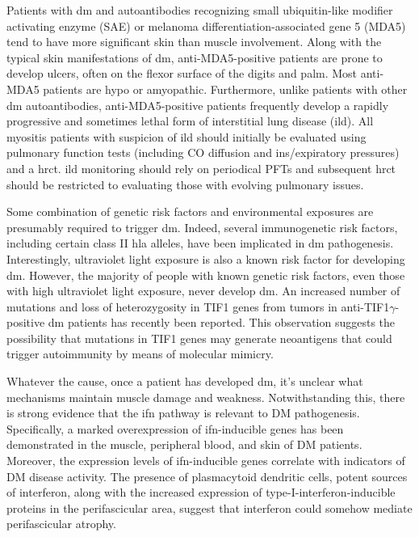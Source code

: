 Patients with \gls{dm} and autoantibodies recognizing small ubiquitin-like modifier activating enzyme (SAE) or melanoma differentiation-associated gene 5 (MDA5) tend to have more significant skin than muscle involvement.\cite{Ge2017,LabradorHorrillo2014,Sato2009,Narang2015} Along with the typical skin manifestations of \gls{dm}, anti-MDA5-positive patients are prone to develop ulcers, often on the flexor surface of the digits and palm.\cite{Narang2015} Most anti-MDA5 patients are hypo or amyopathic.\cite{LabradorHorrillo2014,Sato2009,Narang2015} Furthermore, unlike patients with other \gls{dm} autoantibodies, anti-MDA5-positive patients frequently develop a rapidly progressive and sometimes lethal form of interstitial lung disease (\gls{ild}).\cite{LabradorHorrillo2014,Sato2009} All myositis patients with suspicion of \gls{ild} should initially be evaluated using pulmonary function tests (including CO diffusion and ins/expiratory pressures) and a \gls{hrct}. \gls{ild} monitoring should rely on periodical PFTs and subsequent \gls{hrct} should be restricted to evaluating those with evolving pulmonary issues.

Some combination of genetic risk factors and environmental exposures are presumably required to trigger \gls{dm}. Indeed, several immunogenetic risk factors, including certain class II \gls{hla} alleles, have been implicated in \gls{dm} pathogenesis.\cite{Miller2015} Interestingly, ultraviolet light exposure is also a known risk factor for developing \gls{dm}.\cite{Mamyrova2017} However, the majority of people with known genetic risk factors, even those with high ultraviolet light exposure, never develop \gls{dm}. An increased number of mutations and loss of heterozygosity in TIF1 genes from tumors in anti-TIF1$\gamma$-positive \gls{dm} patients has recently been reported.\cite{PinalFernandez2018} This observation suggests the possibility that mutations in TIF1 genes may generate neoantigens that could trigger autoimmunity by means of molecular mimicry.

Whatever the cause, once a patient has developed \gls{dm}, it’s unclear what mechanisms maintain muscle damage and weakness. Notwithstanding this, there is strong evidence that the \gls{ifn} pathway is relevant to DM pathogenesis.\cite{Greenberg2005} Specifically, a marked overexpression of \gls{ifn}-inducible genes has been demonstrated in the muscle,\cite{Greenberg2005} peripheral blood,\cite{Walsh2007,Baechler2007} and skin\cite{Wong2012} of DM patients. Moreover, the expression levels of \gls{ifn}-inducible genes correlate with indicators of DM disease activity.\cite{Walsh2007,Baechler2007} The presence of plasmacytoid dendritic cells, potent sources of interferon, along with the increased expression of type-I-interferon-inducible proteins in the perifascicular area, suggest that interferon could somehow mediate perifascicular atrophy.\cite{SuarezCalvet2017,Greenberg2005} 

